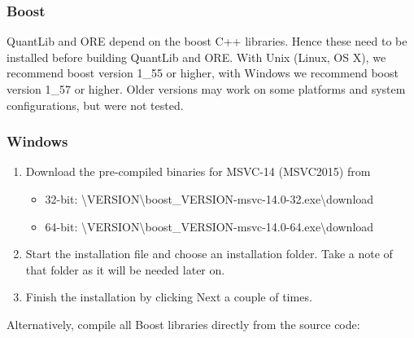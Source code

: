 \documentclass[12pt, a4paper]{article}
\newcommand{\bs}{\textbackslash}
\begin{document}
\subsubsection{Boost}\label{sec:boost}

QuantLib and ORE depend on the boost C++ libraries. Hence these need to be installed before building QuantLib and
ORE. With Unix (Linux, OS X), we recommend boost version 1\_55 or higher, with Windows we recommend boost version 1\_57
or higher. Older versions may work on some platforms and system configurations, but were not tested.

\subsubsection*{Windows}

\begin{enumerate}
\item Download the pre-compiled binaries for MSVC-14 (MSVC2015) from \cite{boost-binaries}
\begin{itemize}
\item 32-bit: \cite{boost-binaries}{\bs}VERSION{\bs}boost\_VERSION-msvc-14.0-32.exe{\bs}download 
\item 64-bit: \cite{boost-binaries}{\bs}VERSION{\bs}boost\_VERSION-msvc-14.0-64.exe{\bs}download
\end{itemize}
\item Start the installation file and choose an installation folder. Take a note of that folder as it will be needed
  later on.
\item Finish the installation by clicking Next a couple of times.
\end{enumerate}
    
Alternatively, compile all Boost libraries directly from the source code:
\end{document}
